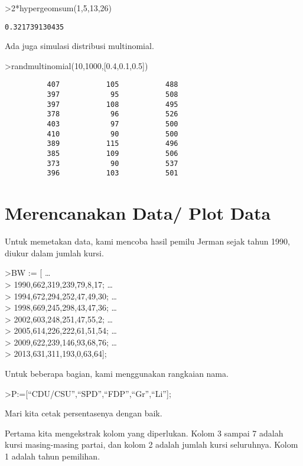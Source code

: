 \documentclass[
]{book}
\begin{document}
\textgreater2*hypergeomsum(1,5,13,26)

\begin{verbatim}
0.321739130435
\end{verbatim}

Ada juga simulasi distribusi multinomial.

\textgreater randmultinomial(10,1000,{[}0.4,0.1,0.5{]})

\begin{verbatim}
          407           105           488 
          397            95           508 
          397           108           495 
          378            96           526 
          403            97           500 
          410            90           500 
          389           115           496 
          385           109           506 
          373            90           537 
          396           103           501 
\end{verbatim}

\chapter{Merencanakan Data/ Plot Data}\label{merencanakan-data-plot-data}

Untuk memetakan data, kami mencoba hasil pemilu Jerman sejak tahun 1990, diukur dalam jumlah kursi.

\textgreater BW := {[} \ldots{}\\
\textgreater{} 1990,662,319,239,79,8,17; \ldots{}\\
\textgreater{} 1994,672,294,252,47,49,30; \ldots{}\\
\textgreater{} 1998,669,245,298,43,47,36; \ldots{}\\
\textgreater{} 2002,603,248,251,47,55,2; \ldots{}\\
\textgreater{} 2005,614,226,222,61,51,54; \ldots{}\\
\textgreater{} 2009,622,239,146,93,68,76; \ldots{}\\
\textgreater{} 2013,631,311,193,0,63,64{]};

Untuk beberapa bagian, kami menggunakan rangkaian nama.

\textgreater P:={[}``CDU/CSU'',``SPD'',``FDP'',``Gr'',``Li''{]};

Mari kita cetak persentasenya dengan baik.

Pertama kita mengekstrak kolom yang diperlukan. Kolom 3 sampai 7 adalah kursi masing-masing partai, dan kolom 2 adalah jumlah kursi seluruhnya. Kolom 1 adalah tahun pemilihan.
\end{document}
